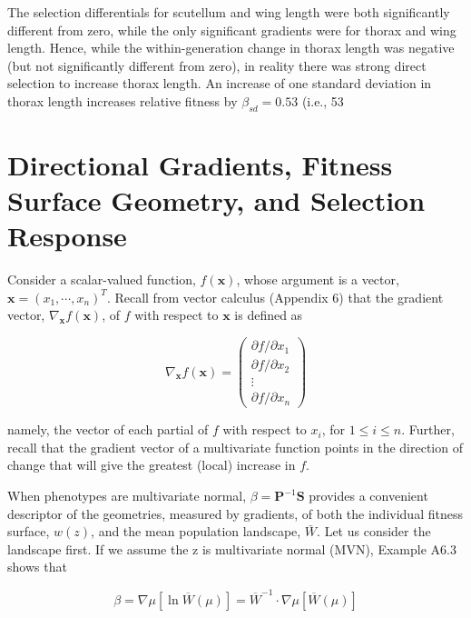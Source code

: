 \documentclass{article}
\begin{document}
The selection differentials for scutellum and wing length were both significantly different from zero, while the only significant gradients were for thorax and wing length. Hence, while the within-generation change in thorax length was negative (but not significantly different from zero), in reality there was strong direct selection to increase thorax length. An increase of one standard deviation in thorax length increases relative fitness by  $ \beta_{sd} = 0.53 $ (i.e., 53%

\section{Directional Gradients, Fitness Surface Geometry, and Selection Response}
Consider a scalar-valued function, $f(\mathbf{x})$, whose argument is a vector, $\mathbf{x} = (x_1, \cdots, x_n)^T$. Recall from vector calculus (Appendix 6) that the gradient vector, $\nabla_{\mathbf{x}} f(\mathbf{x})$, of $f$ with respect to $\mathbf{x}$ is defined as

\begin{equation}
\nabla_{\mathbf{x}}f(\mathbf{x})=\begin{pmatrix}\partial f/\partial x_{1}\\ \partial f/\partial x_{2}\\ \vdots\\ \partial f/\partial x_{n}\end{pmatrix}
\end{equation}

namely, the vector of each partial of $f$ with respect to $x_{i}$, for $1 \leq i \leq n$. Further, recall that the gradient vector of a multivariate function points in the direction of change that will give the greatest (local) increase in $f$.

When phenotypes are multivariate normal,  $ \beta = \mathbf{P}^{-1} \mathbf{S} $ provides a convenient descriptor of the geometries, measured by gradients, of both the individual fitness surface,  $ w(z) $, and the mean population landscape,  $ \bar{W} $. Let us consider the landscape first. If we assume the z is multivariate normal (MVN), Example A6.3 shows that

\begin{equation}
\beta=\nabla\mu[\ln\overline{W}(\mu)]=\overline{W}^{-1}\cdot\nabla\mu[\overline{W}(\mu)]
\tag{30.5a}
\label{eq:30_5a}
\end{equation}
\end{document}
